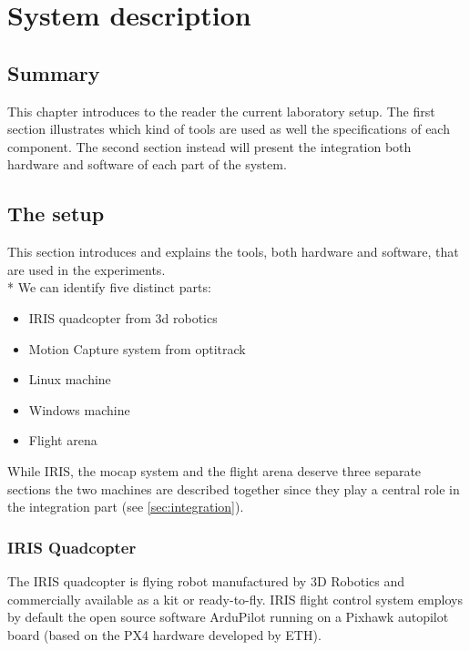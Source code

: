 
\chapter{System description}
\label{chap:third}
\ifpdf
    \graphicspath{{Chapter3/Figures/PNG/}{Chapter3/Figures/PDF/}{Chapter3/Figures/}}
\else
    \graphicspath{{Chapter3/Figures/EPS/}{Chapter3/Figures/}}
\fi

\section*{Summary}

This chapter introduces to the reader the current laboratory setup. The first section illustrates which kind of tools are used as well the specifications of each component. The second section instead will present the integration both hardware and software of each part of the system. 

\section{The setup}
\label{sec:setup}
This section introduces and explains the tools, both hardware and software, that are used in the experiments. \\*
We can identify five distinct parts:
\begin{itemize}
\item  IRIS quadcopter from 3d robotics
\item  Motion Capture system from optitrack
\item  Linux machine
\item  Windows machine
\item  Flight arena
\end{itemize}
While IRIS, the mocap system and the flight arena deserve three separate sections the two machines are described together since they play a central role in the integration part (see \ref{sec:integration}).

\subsection{IRIS Quadcopter}

The IRIS quadcopter is flying robot manufactured by 3D Robotics and commercially available as a kit or ready-to-fly. IRIS flight control system employs by default the open source software ArduPilot running on a Pixhawk autopilot board (based on the PX4 hardware developed by ETH).

